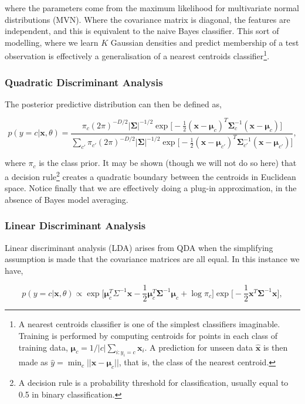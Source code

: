 \documentclass[11pt]{amsart}
\begin{document}
where the parameters come from the maximum likelihood for multivariate normal distributions (MVN). Where the covariance matrix is diagonal, the features are independent, and this is equivalent to the naive Bayes classifier. This sort of modelling, where we learn $K$ Gaussian densities and predict membership of a test observation is effectively a generalisation of a nearest centroids classifier\footnote{A nearest centroids classifier is one of the simplest classifiers imaginable. Training is performed by computing centroids for points in each class of training data, $\boldsymbol\mu_c = 1/|c|\sum_{i:y_i=c}\mathbf{x}_i$. A prediction for unseen data $\hat{\mathbf{x}}$ is then made as $\hat{y} = \min_c ||\hat{\mathbf{x}} - \boldsymbol\mu_c||$, that is, the class of the nearest centroid.}.

\subsubsection{Quadratic Discriminant Analysis}

The posterior predictive distribution can then be defined as,

$$p(y = c|\mathbf{x}, \theta) = \frac{\pi_c(2\pi)^{-D/2}|\boldsymbol\Sigma|^{-1/2}\exp\big[-\frac{1}{2}(\mathbf{x} - \mathbf{\mu}_c)^T\boldsymbol\Sigma_c^{-1}(\mathbf{x} - \boldsymbol\mu_c)\big]}{\sum_{c'}\pi_{c'}(2\pi)^{-D/2}|\boldsymbol\Sigma|^{-1/2}\exp\big[-\frac{1}{2}(\mathbf{x} - \boldsymbol\mu_{c'})^T\boldsymbol\Sigma_{c'}^{-1}(\mathbf{x} - \boldsymbol\mu_{c'})\big]},$$

where $\pi_c$ is the class prior. It may be shown (though we will not do so here) that a decision rule\footnote{A decision rule is a probability threshold for classification, usually equal to 0.5 in binary classification.} creates a quadratic boundary between the centroids in Euclidean space. Notice finally that we are effectively doing a plug-in approximation, in the absence of Bayes model averaging.

\subsubsection{Linear Discriminant Analysis}

Linear discriminant analysis (LDA) arises from QDA when the simplifying assumption is made that the covariance matrices are all equal. In this instance we have,

$$p(y = c|\mathbf{x}, \theta) \propto \exp\Big[\boldsymbol\mu_c^T\Sigma^{-1}\mathbf{x} - \frac{1}{2}\boldsymbol\mu_c^T\boldsymbol\Sigma^{-1}\boldsymbol\mu_c + \log\pi_c\Big]\exp\Big[-\frac{1}{2}\mathbf{x}^T\boldsymbol\Sigma^{-1}\mathbf{x}\Big],$$
\end{document}

